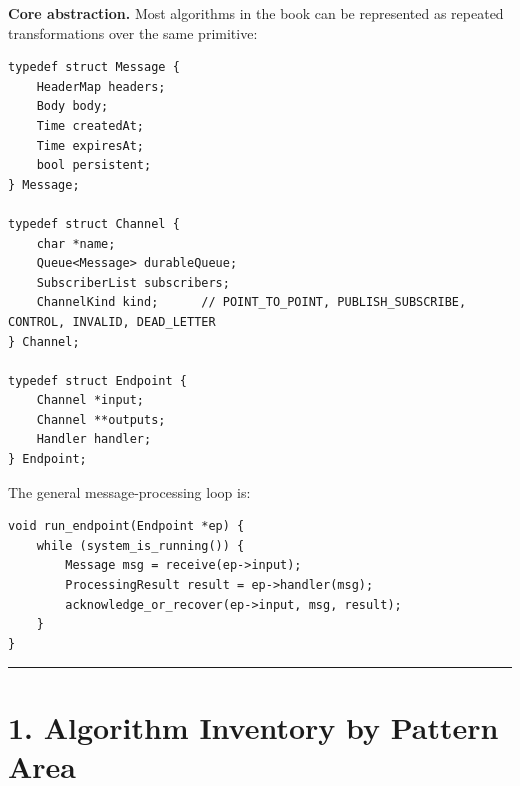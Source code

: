 \documentclass[11pt]{article}
\begin{document}
\textbf{Core abstraction.} Most algorithms in the book can be
represented as repeated transformations over the same primitive:

\begin{verbatim}
typedef struct Message {
    HeaderMap headers;
    Body body;
    Time createdAt;
    Time expiresAt;
    bool persistent;
} Message;

typedef struct Channel {
    char *name;
    Queue<Message> durableQueue;
    SubscriberList subscribers;
    ChannelKind kind;      // POINT_TO_POINT, PUBLISH_SUBSCRIBE, CONTROL, INVALID, DEAD_LETTER
} Channel;

typedef struct Endpoint {
    Channel *input;
    Channel **outputs;
    Handler handler;
} Endpoint;
\end{verbatim}

The general message-processing loop is:

\begin{verbatim}
void run_endpoint(Endpoint *ep) {
    while (system_is_running()) {
        Message msg = receive(ep->input);
        ProcessingResult result = ep->handler(msg);
        acknowledge_or_recover(ep->input, msg, result);
    }
}
\end{verbatim}

\begin{center}\rule{0.5\linewidth}{0.5pt}\end{center}

\section{1. Algorithm Inventory by Pattern
Area}\label{algorithm-inventory-by-pattern-area}
\end{document}
